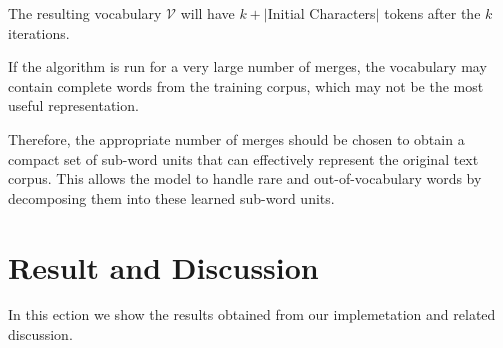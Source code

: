 The resulting vocabulary $\mathcal{V}$ will have $k + |$Initial Characters$|$ tokens after the $k$ iterations.

If the algorithm is run for a very large number of merges, the vocabulary may contain complete words from the training corpus, which may not be the most useful representation.

Therefore, the appropriate number of merges should be chosen to obtain a compact set of sub-word units that can effectively represent the original text corpus. This allows the model to handle rare and out-of-vocabulary words by decomposing them into these learned sub-word units.
\section{Result and Discussion}
In this ection we show the results obtained from our implemetation and related discussion.
